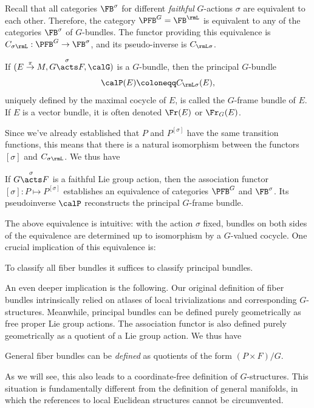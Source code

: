 Recall that all categories $\FB^\sigma$ for different \emph{faithful} $G$-actions $\sigma$ are equivalent to each other. Therefore, the category $\PFB^G=\FB^\rmL$ is equivalent to any of the categories $\FB^\sigma$ of $G$-bundles. The functor providing this equivalence is $C_{\sigma \rmL}:\PFB^G\to \FB^\sigma$, and its pseudo-inverse is $C_{\rmL\sigma}$. 

\begin{defn}
    If $(E\overset{\pi}{\to}M,G\overset{\sigma}{\acts}F,\calG)$ is a $G$-bundle, then the principal $G$-bundle \[\calP(E)\coloneqq C_{\rmL \sigma}(E),\] uniquely defined by the maximal cocycle of $E$, is called the $G$-frame bundle of $E$. If $E$ is a vector bundle, it is often denoted $\Fr(E)$ or $\Fr_G(E)$.
\end{defn}

Since we've already established that $P$ and $P^{[\sigma]}$ have the same transition functions, this means that there is a natural isomorphism between the functors $[\sigma]$ and $C_{\sigma \rmL}$. We thus have
\begin{prop}
    If $G\overset{\sigma}{\acts}F$ is a faithful Lie group action, then the association functor $[\sigma]:P\mapsto P^{[\sigma]}$ establishes an equivalence of categories $\PFB^G$ and $\FB^\sigma$. Its pseudoinverse $\calP$ reconstructs the principal $G$-frame bundle.
\end{prop}

\begin{rem}
    The above equivalence is intuitive: with the action $\sigma$ fixed, bundles on both sides of the equivalence are determined up to isomorphism by a $G$-valued cocycle. One crucial implication of this equivalence is:
    \begin{center}
        To classify all fiber bundles it suffices to classify principal bundles.
    \end{center}
    An even deeper implication is the following. Our original definition of fiber bundles intrinsically relied on atlases of local trivializations and corresponding $G$-structures. Meanwhile, principal bundles can be defined purely geometrically as free proper Lie group actions. The association functor is also defined purely geometrically as a quotient of a Lie group action. We thus have
    \begin{center}
        General fiber bundles can be \emph{defined} as quotients of the form $(P\times F)\slash G$.
    \end{center}
    As we will see, this also leads to a coordinate-free definition of $G$-structures. This situation is fundamentally different from the definition of general manifolds, in which the references to local Euclidean structures cannot be circumvented.
\end{rem}

